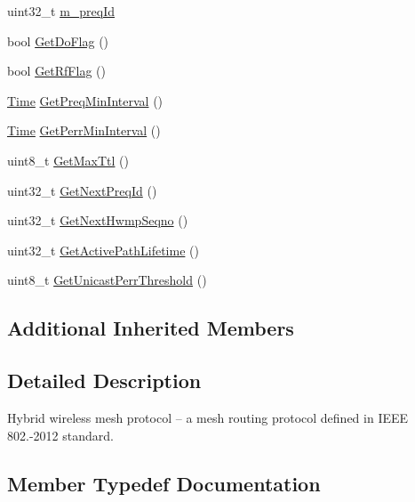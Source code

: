 \begin{DoxyCompactItemize}
uint32\+\_\+t \hyperlink{classns3_1_1dot11s_1_1HwmpProtocol_af3bbd37367d2b1363d2010c95499d22c}{m\+\_\+preq\+Id}
\item 
bool \hyperlink{classns3_1_1dot11s_1_1HwmpProtocol_a8eceaba84dca8fb5f4262fcd6be3be58}{Get\+Do\+Flag} ()
\item 
bool \hyperlink{classns3_1_1dot11s_1_1HwmpProtocol_a7828d072150495db4a9d4932733df822}{Get\+Rf\+Flag} ()
\item 
\hyperlink{classns3_1_1Time}{Time} \hyperlink{classns3_1_1dot11s_1_1HwmpProtocol_a8ed2ff16647fe69d67fd50ac727ca8b0}{Get\+Preq\+Min\+Interval} ()
\item 
\hyperlink{classns3_1_1Time}{Time} \hyperlink{classns3_1_1dot11s_1_1HwmpProtocol_a2aee6a4a32d5a1c1e2e19f9a7ba12d41}{Get\+Perr\+Min\+Interval} ()
\item 
uint8\+\_\+t \hyperlink{classns3_1_1dot11s_1_1HwmpProtocol_ac9be61d6351426c67c53528b4bde7d5d}{Get\+Max\+Ttl} ()
\item 
uint32\+\_\+t \hyperlink{classns3_1_1dot11s_1_1HwmpProtocol_a9aad7787e0238e8c90decec8ab4d96ad}{Get\+Next\+Preq\+Id} ()
\item 
uint32\+\_\+t \hyperlink{classns3_1_1dot11s_1_1HwmpProtocol_a1b627657878666de9b9c913d82c35853}{Get\+Next\+Hwmp\+Seqno} ()
\item 
uint32\+\_\+t \hyperlink{classns3_1_1dot11s_1_1HwmpProtocol_acfc77a36ca687b5808faa4f98c84a377}{Get\+Active\+Path\+Lifetime} ()
\item 
uint8\+\_\+t \hyperlink{classns3_1_1dot11s_1_1HwmpProtocol_aa3e96b75306440eca210a9191fb6f8ae}{Get\+Unicast\+Perr\+Threshold} ()
\end{DoxyCompactItemize}
\subsection*{Additional Inherited Members}


\subsection{Detailed Description}
Hybrid wireless mesh protocol -- a mesh routing protocol defined in I\+E\+EE 802.-\/2012 standard. 

\subsection{Member Typedef Documentation}
